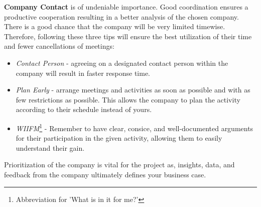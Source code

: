 \textbf{Company Contact} is of undeniable importance. Good coordination ensures a productive cooperation resulting in a better analysis of the chosen company.
\\
There is a good chance that the company will be very limited timewise. Therefore, following these three tips will ensure the best utilization of their time and fewer cancellations of meetings:
\begin{itemize}
	\item \textit{Contact Person} - agreeing on a designated contact person within the company will result in faster response time.
	\item \textit{Plan Early} - arrange meetings and activities as soon as possible and with as few restrictions as possible. This allows the company to plan the activity according to their schedule instead of yours.
	\item \textit{WIIFM}\footnote{Abbreviation for 'What is in it for me?'} - Remember to have clear, consice, and well-documented arguments for their participation in the given activity, allowing them to easily understand their gain.
\end{itemize}
Prioritization of the company is vital for the project as, insights, data, and feedback from the company ultimately defines your business case.
